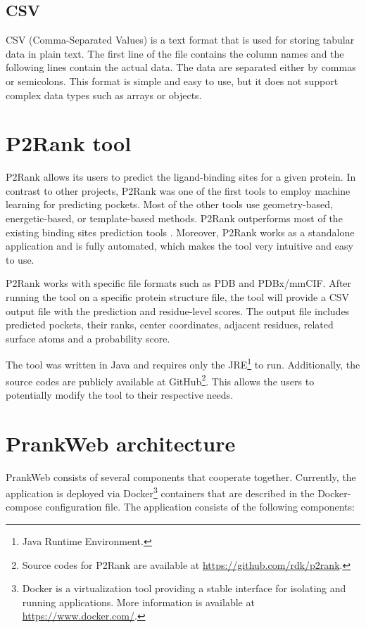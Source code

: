 \subsection{CSV}
\label{subsec:CSV}

CSV (Comma-Separated Values) is a text format that is used for storing tabular data in plain text. The first line of the file contains the column names and the following lines contain the actual data. The data are separated either by commas or semicolons. This format is simple and easy to use, but it does not support complex data types such as arrays or objects.

\section{P2Rank tool}
\label{sec:p2rank}

P2Rank allows its users to predict the ligand-binding sites for a given protein. In contrast to other projects, P2Rank was one of the first tools to employ machine learning for predicting pockets. Most of the other tools use geometry-based, energetic-based, or template-based methods. P2Rank outperforms most of the existing binding sites prediction tools \cite{krivak2018p2rank}. Moreover, P2Rank works as a standalone application and is fully automated, which makes the tool very intuitive and easy to use.

P2Rank works with specific file formats such as PDB and PDBx/mmCIF. After running the tool on a specific protein structure file, the tool will provide a CSV output file with the prediction and residue-level scores. The output file includes predicted pockets, their ranks, center coordinates, adjacent residues, related surface atoms and a probability score.

The tool was written in Java and requires only the JRE\footnote{Java Runtime Environment.} to run. Additionally, the source codes are publicly available at GitHub\footnote{Source codes for P2Rank are available at \url{https://github.com/rdk/p2rank}.}. This allows the users to potentially modify the tool to their respective needs. 

\section{PrankWeb architecture}
\label{sec:prankweb_arch}

PrankWeb consists of several components that cooperate together. Currently, the application is deployed via Docker\footnote{Docker is a virtualization tool providing a stable interface for isolating and running applications. More information is available at \url{https://www.docker.com/}.} containers that are described in the Docker-compose configuration file. The application consists of the following components:

